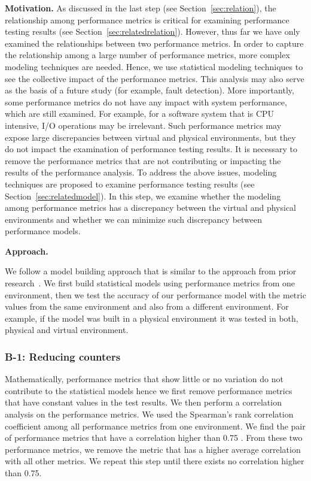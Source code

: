 \documentclass[smallextended]{svjour3}       %
\begin{document}
\noindent \textbf{Motivation.}
As discussed in the last step (see Section~\ref{sec:relation}), the relationship among performance metrics is critical for examining performance testing results (see Section~\ref{sec:relatedrelation}). However, thus far we have only examined the relationships between two performance metrics. In order to capture the relationship among a large number of performance metrics, more complex modeling techniques are needed. Hence, we use statistical modeling techniques to see the collective impact of the performance metrics. This analysis may also serve as the basis of a future study (for example, fault detection). More importantly, some performance metrics do not have any impact with system performance, which are still examined. For example, for a software system that is CPU intensive, I/O operations may be irrelevant. Such performance metrics may expose large discrepancies between virtual and physical environments, but they do not impact the examination of performance testing results. It is necessary to remove the performance metrics that are not contributing or impacting the results of the performance analysis. To address the above issues, modeling techniques are proposed to examine performance testing results (see Section~\ref{sec:relatedmodel}). In this step, we examine whether the modeling among performance metrics has a discrepancy between the virtual and physical environments and whether we can minimize such discrepancy between performance models.


\noindent \textbf{Approach. }

We follow a model building approach that is similar to the approach from prior research~\cite{Shang:2015:ADP:2668930.2688052,Cohen:2005:CIC:1095810.1095821,xiong2013vperfguard}. We first build statistical models using performance metrics from one environment, then we test the accuracy of our performance model with the metric values from the same environment and also from a different environment. For example, if the model was built in a physical environment it was tested in both, physical and virtual environment.

\subsubsection{B-1: Reducing counters}

Mathematically, performance metrics that show little or no variation do not contribute to the statistical models hence we first remove performance metrics that have constant values in the test results. We then perform a correlation analysis on the performance metrics. We used the Spearman's rank correlation coefficient among all performance metrics from one environment. We find the pair of performance metrics that have a correlation higher than 0.75 \cite{Syer2016}. From these two performance metrics, we remove the metric that has a higher average correlation with all other metrics. We repeat this step until there exists no correlation higher than 0.75.
\end{document}
